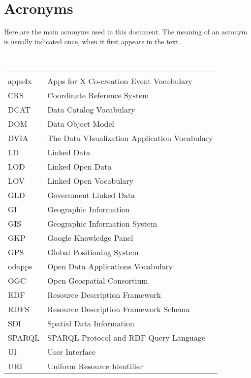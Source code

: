 

\chapter*{Acronyms}

Here are the main acronyms used in this document. The meaning of an acronym is usually indicated once, when it first appears in the text. 

 \\

\begin{longtable}{lp{11cm}}
  &\\
  apps4x	 & Apps for X Co-creation Event Vocabulary\\
  CRS &  Coordinate Reference System\\
  
  DCAT & 	Data Catalog Vocabulary\\
  DOM  & Data Object Model \\
  DVIA & The Data VIsualization Application Vocabulary\\
  
  
  LD  &  Linked Data\\
  LOD &  Linked Open Data\\ 
  
  
  LOV &  Linked Open Vocabulary\\
  
  GLD &  Government Linked Data\\
  GI  &  Geographic Information\\
  GIS &  Geographic Information System\\
  GKP &  Google Knowledge Panel \\
  GPS &  Global Positioning System \\
  
  odapps	 & Open Data Applications Vocabulary\\
  OGC &  Open Geospatial Consortium\\
  
  RDF &  Resource Description Framework\\
  RDFS & Resource Description Framework Schema\\
  SDI  & Spatial Data Information\\
  SPARQL	 & SPARQL Protocol and RDF Query Language\\
  UI  & User Interface \\
  URI &	Uniform Resource Identifier\\
  







  
  
 
\end{longtable}
